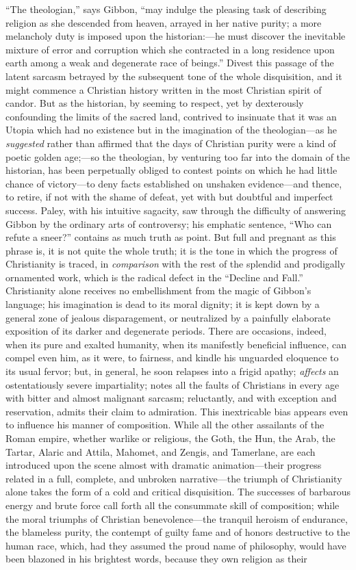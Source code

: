 “The theologian,” says Gibbon, “may indulge the pleasing task of describing religion as she descended from heaven, arrayed in her native purity; a more melancholy duty is imposed upon the historian:—he must discover the inevitable mixture of error and corruption which she contracted in a long residence upon earth among a weak and degenerate race of beings.” Divest this passage of the latent sarcasm betrayed by the subsequent tone of the whole disquisition, and it might commence a Christian history written in the most Christian spirit of candor. But as the historian, by seeming to respect, yet by dexterously confounding the limits of the sacred land, contrived to insinuate that it was an Utopia which had no existence but in the imagination of the theologian—as he \textit{suggested} rather than affirmed that the days of Christian purity were a kind of poetic golden age;—so the theologian, by venturing too far into the domain of the historian, has been perpetually obliged to contest points on which he had little chance of victory—to deny facts established on unshaken evidence—and thence, to retire, if not with the shame of defeat, yet with but doubtful and imperfect success. Paley, with his intuitive sagacity, saw through the difficulty of answering Gibbon by the ordinary arts of controversy; his emphatic sentence, “Who can refute a sneer?” contains as much truth as point. But full and pregnant as this phrase is, it is not quite the whole truth; it is the tone in which the progress of Christianity is traced, in \textit{comparison} with the rest of the splendid and prodigally ornamented work, which is the radical defect in the “Decline and Fall.” Christianity alone receives no embellishment from the magic of Gibbon’s language; his imagination is dead to its moral dignity; it is kept down by a general zone of jealous disparagement, or neutralized by a painfully elaborate exposition of its darker and degenerate periods. There are occasions, indeed, when its pure and exalted humanity, when its manifestly beneficial influence, can compel even him, as it were, to fairness, and kindle his unguarded eloquence to its usual fervor; but, in general, he soon relapses into a frigid apathy; \textit{affects} an ostentatiously severe impartiality; notes all the faults of Christians in every age with bitter and almost malignant sarcasm; reluctantly, and with exception and reservation, admits their claim to admiration. This inextricable bias appears even to influence his manner of composition. While all the other assailants of the Roman empire, whether warlike or religious, the Goth, the Hun, the Arab, the Tartar, Alaric and Attila, Mahomet, and Zengis, and Tamerlane, are each introduced upon the scene almost with dramatic animation—their progress related in a full, complete, and unbroken narrative—the triumph of Christianity alone takes the form of a cold and critical disquisition. The successes of barbarous energy and brute force call forth all the consummate skill of composition; while the moral triumphs of Christian benevolence—the tranquil heroism of endurance, the blameless purity, the contempt of guilty fame and of honors destructive to the human race, which, had they assumed the proud name of philosophy, would have been blazoned in his brightest words, because they own religion as their 